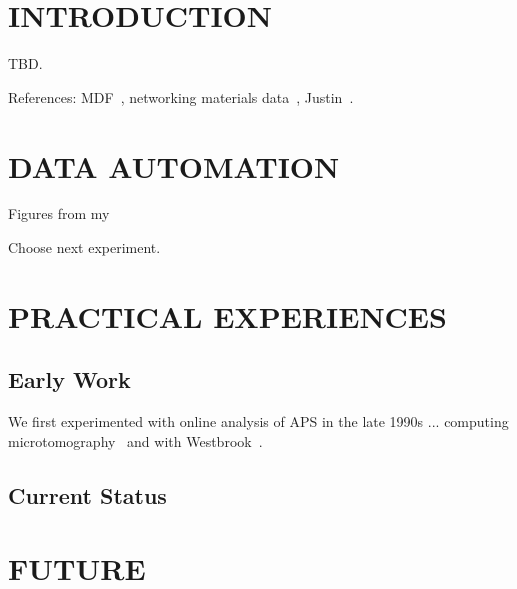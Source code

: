 \documentclass{aip-cp}
\newcommand\ian[1]{}
\newcommand\ian[1]{{\color{red}[Ian: #1]}}
\begin{document}
\section{INTRODUCTION}

\ian{Potential authors: Ben Blaiszik, Kyle Chard, Ryan Chard, Logan Ward, Justin Wozniak, ...}

TBD.


References: MDF~\cite{MDF2016}, networking materials data~\cite{foster2015networking}, Justin~\cite{wozniak2015big}.


\section{DATA AUTOMATION}

Figures from my 

Choose next experiment.


\section{PRACTICAL EXPERIENCES}

\subsection{Early Work}

We first experimented with online analysis of APS in the late 1990s ...
computing microtomography~\cite{wang1999quasi,wang2001high} and with Westbrook~\cite{von2000using}.

\subsection{Current Status}



\section{FUTURE}






\end{document}
